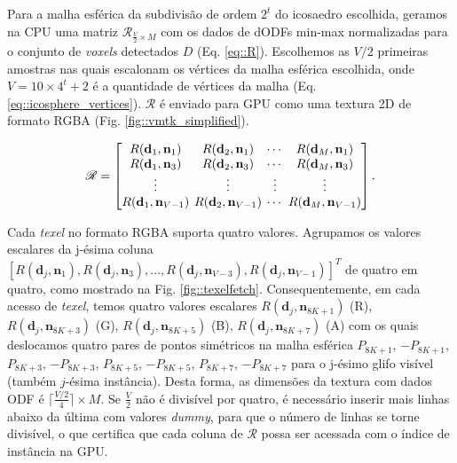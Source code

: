 Para a malha esférica da subdivisão de ordem $2^t$ do icosaedro escolhida, geramos na CPU uma matriz $\boldsymbol{\mathscr{R}}_{\frac{V}{2} \times M}$ com os dados de dODFs min-max normalizadas para o conjunto de \textit{voxels} detectados $D$ (Eq. \ref{eq::R}). Escolhemos as $V/2$ primeiras amostras nas quais escalonam os vértices da malha esférica escolhida, onde $V = 10 \times 4^t + 2$ é a quantidade de vértices da malha (Eq. \ref{eq::icosphere_vertices}). $\boldsymbol{\mathscr{R}}$ é enviado para GPU como uma textura 2D de formato RGBA (Fig. \ref{fig::vmtk_simplified}).


\begin{equation}
\label{eq::R}
\boldsymbol{\mathscr{R}} = 
\begingroup %
\setlength\arraycolsep{2pt}
\begin{bmatrix} 
    R(\mathbf{d}_{1}, \mathbf{n}_1) &
    R(\mathbf{d}_{2}, \mathbf{n}_1) & \cdots & 
    R(\mathbf{d}_{M}, \mathbf{n}_1)  \\
    
    R(\mathbf{d}_{1}, \mathbf{n}_3) &
    R(\mathbf{d}_{2}, \mathbf{n}_3) & \cdots & 
    R(\mathbf{d}_{M}, \mathbf{n}_{3}) \\ \vdots & \vdots & \vdots & \vdots  \\
    
    R(\mathbf{d}_{1}, \mathbf{n}_{V-1}) & 
    R(\mathbf{d}_{2}, \mathbf{n}_{V-1}) & \cdots & 
    R(\mathbf{d}_{M}, \mathbf{n}_{V-1})
\end{bmatrix}.
\endgroup
\end{equation}

Cada \textit{texel} no formato RGBA suporta quatro valores. Agrupamos os valores escalares da j-ésima coluna $[
R(\mathbf{d}_{j}, \mathbf{n}_1),
R(\mathbf{d}_{j}, \mathbf{n}_3), ...,
R(\mathbf{d}_{j}, \mathbf{n}_{V-3}),
R(\mathbf{d}_{j}, \mathbf{n}_{V-1})
]^T$ de quatro em quatro, como mostrado na Fig. \ref{fig::texelfetch}. Consequentemente, em cada acesso de \textit{texel}, temos quatro valores escalares $
R(\mathbf{d}_{j}, \mathbf{\mathbf{n}}_{8K+1})$ (R), $
R(\mathbf{d}_{j}, \mathbf{\mathbf{n}}_{8K+3})$ (G), $
R(\mathbf{d}_{j}, \mathbf{\mathbf{n}}_{8K+5})$ (B), $
R(\mathbf{d}_{j}, \mathbf{\mathbf{n}}_{8K+7})$ (A) com os quais deslocamos quatro pares de pontos simétricos na malha esférica $P_{8K+1}$, $-P_{8K+1}$, $P_{8K+3}$, $-P_{8K+3}$, $P_{8K+5}$, $-P_{8K+5}$, $P_{8K+7}$, $-P_{8K+7}$ para o j-ésimo glifo visível (também $j$-ésima instância). Desta forma, as dimensões da textura com dados ODF é $ \lceil \frac{V/2}{4} \rceil \times M$. Se $\frac{V}{2}$ não é divisível por quatro, é necessário inserir mais linhas abaixo da última com valores \textit{dummy}, para que o número de linhas se torne divisível, o que certifica que cada coluna de $\boldsymbol{\mathscr{R}}$ possa ser acessada com o índice de instância na GPU.

